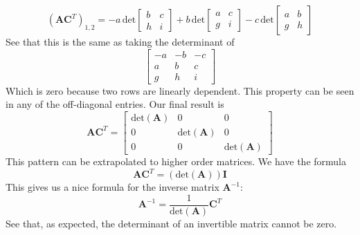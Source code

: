 \documentclass{report}
\begin{document}
\begin{equation*}
(\bm{AC}^T)_{1,2}=-a\,\text{det}\left[\begin{array}{cc}b&c\\h&i\end{array}\right]+b\,
\text{det}\left[\begin{array}{cc}a&c\\g&i\end{array}\right]
-c\,\text{det}\left[\begin{array}{cc}a&b\\g&h\end{array}\right]
\end{equation*}
See that this is the same as taking the determinant of 	
\begin{equation*}
\left[\begin{array}{ccc}
-a&-b&-c\\
a&b&c\\
g&h&i
\end{array}\right]
\end{equation*}
Which is zero because two rows are linearly dependent. This property can be seen in any of the off-diagonal entries. Our final result is
\begin{equation*}
\bm{AC}^T=\left[\begin{array}{ccc}
\text{det}(\bm A)&0&0\\
0&\text{det}(\bm A)&0\\
0&0&\text{det}(\bm A)
\end{array}\right]
\end{equation*}
This pattern can be extrapolated to higher order matrices. We have the formula
\begin{equation*}
\bm{AC}^T=(\text{det}(\bm A))\bm I
\end{equation*}
This gives us a nice formula for the inverse matrix $\bm A^{-1}$:
\begin{equation*}
\bm A^{-1}=\frac{1}{\text{det}(\bm A)}\bm C^T
\end{equation*}
See that, as expected, the determinant of an invertible matrix cannot be zero.
\newpage
\end{document}
